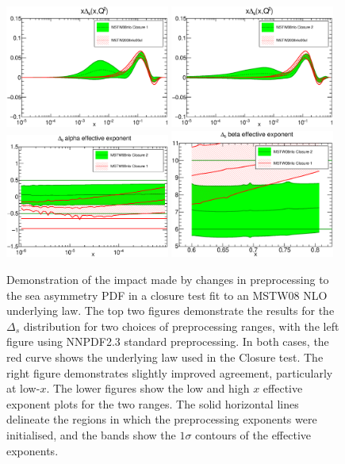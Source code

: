 \begin{figure}[hp!]
\centering
\includegraphics[width=0.48\textwidth]{7-PostLHC/figs/Preproc1/pdf_xDs_log_others.eps}
\includegraphics[width=0.48\textwidth]{7-PostLHC/figs/Preproc2/pdf_xDs_log_others.eps}
\includegraphics[width=0.48\textwidth]{7-PostLHC/figs/Preproc2/alphapreproc_4.eps}
\includegraphics[width=0.48\textwidth]{7-PostLHC/figs/Preproc2/betapreproc_4.eps}
\caption[Demonstration of the impact made by changes in preprocessing to the sea asymmetry PDF in a closure test fit]{Demonstration of the impact made by changes in preprocessing to the sea asymmetry PDF in a closure test fit to an MSTW08 NLO underlying law. The top two figures demonstrate the results for the $\Delta_s$ distribution for two choices of preprocessing ranges, with the left figure using NNPDF2.3 standard preprocessing. In both cases, the red curve shows the underlying law used in the Closure test. The right figure demonstrates slightly improved agreement, particularly at low-$x$. The lower figures show the low and high $x$ effective exponent plots for the two ranges. The solid horizontal lines delineate the regions in which the preprocessing exponents were initialised, and the bands show the $1\sigma$ contours of the effective exponents.}
\label{fig:preproc1}
\end{figure}

